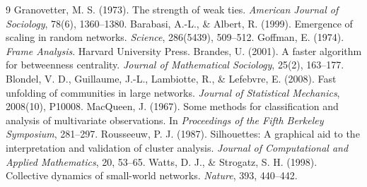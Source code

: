 \documentclass[11pt]{article}
\begin{document}
\begin{thebibliography}{9}
 Granovetter, M. S. (1973). The strength of weak ties. \textit{American Journal of Sociology}, 78(6), 1360--1380.
 Barabasi, A.-L., \& Albert, R. (1999). Emergence of scaling in random networks. \textit{Science}, 286(5439), 509--512.
 Goffman, E. (1974). \textit{Frame Analysis}. Harvard University Press.
 Brandes, U. (2001). A faster algorithm for betweenness centrality. \textit{Journal of Mathematical Sociology}, 25(2), 163--177.
 Blondel, V. D., Guillaume, J.-L., Lambiotte, R., \& Lefebvre, E. (2008). Fast unfolding of communities in large networks. \textit{Journal of Statistical Mechanics}, 2008(10), P10008.
 MacQueen, J. (1967). Some methods for classification and analysis of multivariate observations. In \textit{Proceedings of the Fifth Berkeley Symposium}, 281--297.
 Rousseeuw, P. J. (1987). Silhouettes: A graphical aid to the interpretation and validation of cluster analysis. \textit{Journal of Computational and Applied Mathematics}, 20, 53--65.
 Watts, D. J., \& Strogatz, S. H. (1998). Collective dynamics of small-world networks. \textit{Nature}, 393, 440--442.
\end{thebibliography}
\end{document}
